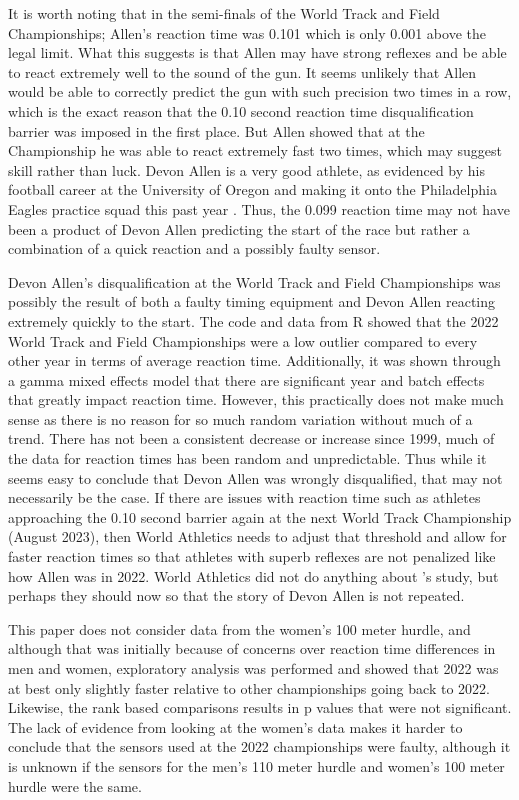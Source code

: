 \documentclass[12pt, letterpaper, titlepage]{article}
\begin{document}
It is worth noting that in the semi-finals of the World Track and
Field Championships; Allen's reaction time was 0.101 which is only 0.001 above
the legal limit.  What this suggests is that Allen may have strong reflexes
and be able to react extremely well to the sound of the gun.  It seems unlikely that
Allen would be able to correctly predict the gun with such precision two times in a row,
which is the exact reason that the 0.10 second reaction time disqualification barrier was
imposed in the first place.  But Allen showed that at the Championship he was able to
react extremely fast two times, which may suggest skill rather than luck. Devon 
Allen is a very good athlete, as evidenced by his football career at the University of Oregon
and making it onto the Philadelphia Eagles practice squad this past year 
\citep{hurley2022eagles}. Thus, the 0.099 reaction time may not have been 
a product of Devon Allen predicting the start of the race but rather a 
combination of a quick reaction and a possibly faulty sensor.

Devon Allen's disqualification at the World Track and Field Championships was
possibly the result of both a faulty timing equipment and Devon Allen
reacting extremely quickly to the start.  The code and data from R showed that
the 2022 World Track and Field Championships were a low outlier compared to
every other year in terms of average reaction time.  Additionally, it was shown
through a gamma mixed effects model that there are significant year and batch
effects that greatly impact reaction time.  However, this practically does not make much sense
as there is no reason for so much random variation without much of a trend.
There has not been a consistent decrease or increase since 1999, much of the data
for reaction times has been random and unpredictable.  Thus while it seems easy
to conclude that Devon Allen was wrongly disqualified, that may not necessarily
be the case.  If there are issues with reaction time such as athletes approaching the 0.10 
second barrier again at the next World Track Championship (August 2023), then World Athletics 
needs to adjust that threshold and allow for faster reaction times so that athletes with superb 
reflexes are not penalized like how Allen was in 2022.  World Athletics did not
do anything about \citet{komi2009iaaf}'s study, but perhaps they should now so
that the story of Devon Allen is not repeated.

This paper does not consider data from the women's 100 meter hurdle, and although
that was initially because of concerns over reaction time differences in men and
women, exploratory analysis was performed and showed that 2022 was at best only
slightly faster relative to other championships going back to 2022.  Likewise,
the rank based comparisons results in p values that were not significant.  The
lack of evidence from looking at the women's data makes it harder to conclude 
that the sensors used at the 2022 championships were faulty, although it is
unknown if the sensors for the men's 110 meter hurdle and women's 100 meter
hurdle were the same.
\end{document}
